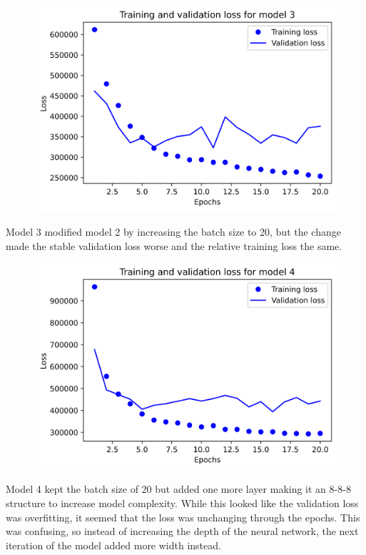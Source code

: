 \documentclass{article}
\begin{document}
    \begin{figure}[H]
        \includegraphics[width=\linewidth]{images/model3.png}
    \end{figure}
    Model 3 modified model 2 by increasing the batch size to 20, but the change made the stable validation loss worse and the relative 
    training loss the same.

    \begin{figure}[H]
        \includegraphics[width=\linewidth]{images/model4.png}
    \end{figure}
    Model 4 kept the batch size of 20 but added one more layer making it an 8-8-8 structure to increase model complexity. 
    While this looked like the validation loss was overfitting, it seemed that the loss was unchanging through the epochs. 
    This was confusing, so instead of increasing the depth of the neural network, the next iteration of the model added 
    more width instead.
\end{document}
